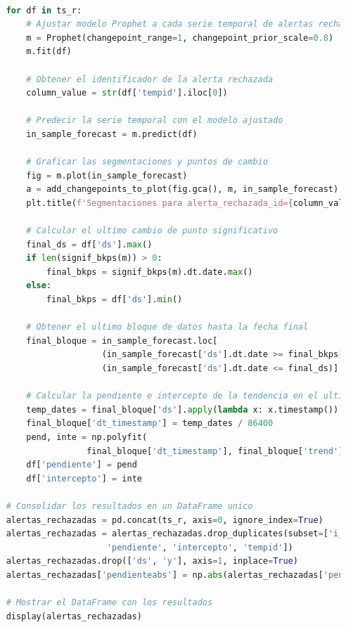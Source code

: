 \documentclass{article}[14pts]
\begin{document}
    \begin{lstlisting}[language=Python]

    for df in ts_r: 
        # Ajustar modelo Prophet a cada serie temporal de alertas rechazadas
        m = Prophet(changepoint_range=1, changepoint_prior_scale=0.8) 
        m.fit(df)

        # Obtener el identificador de la alerta rechazada
        column_value = str(df['tempid'].iloc[0])
        
        # Predecir la serie temporal con el modelo ajustado
        in_sample_forecast = m.predict(df)
        
        # Graficar las segmentaciones y puntos de cambio
        fig = m.plot(in_sample_forecast)
        a = add_changepoints_to_plot(fig.gca(), m, in_sample_forecast)
        plt.title(f'Segmentaciones para alerta_rechazada_id={column_value}')

        # Calcular el ultimo cambio de punto significativo
        final_ds = df['ds'].max()
        if len(signif_bkps(m)) > 0:
            final_bkps = signif_bkps(m).dt.date.max()
        else:
            final_bkps = df['ds'].min()

        # Obtener el ultimo bloque de datos hasta la fecha final
        final_bloque = in_sample_forecast.loc[
                       (in_sample_forecast['ds'].dt.date >= final_bkps) &   
                       (in_sample_forecast['ds'].dt.date <= final_ds)]
        
        # Calcular la pendiente e intercepto de la tendencia en el ultimo bloque
        temp_dates = final_bloque['ds'].apply(lambda x: x.timestamp())
        final_bloque['dt_timestamp'] = temp_dates / 86400
        pend, inte = np.polyfit(
                    final_bloque['dt_timestamp'], final_bloque['trend'], 1)
        df['pendiente'] = pend 
        df['intercepto'] = inte

    # Consolidar los resultados en un DataFrame unico
    alertas_rechazadas = pd.concat(ts_r, axis=0, ignore_index=True)
    alertas_rechazadas = alertas_rechazadas.drop_duplicates(subset=['i_indicador',
                        'pendiente', 'intercepto', 'tempid'])
    alertas_rechazadas.drop(['ds', 'y'], axis=1, inplace=True)
    alertas_rechazadas['pendienteabs'] = np.abs(alertas_rechazadas['pendiente'])

    # Mostrar el DataFrame con los resultados
    display(alertas_rechazadas)

    \end{lstlisting}
\end{document}
